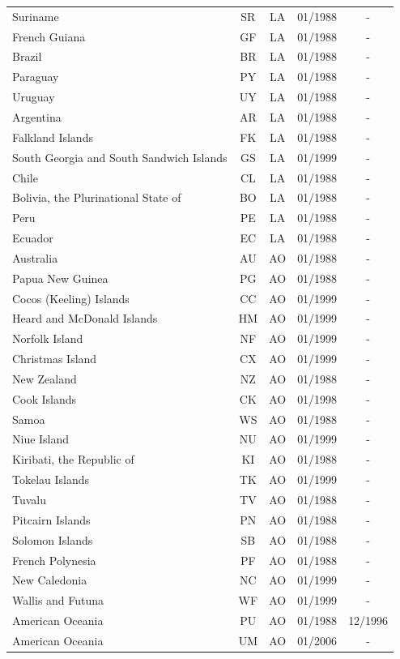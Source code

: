 \begin{small}
\begin{longtable}{p{7.5cm}cccc}
Suriname	&	SR	&	LA	&	01/1988	&	-	\\
French Guiana	&	GF	&	LA	&	01/1988	&	-	\\
Brazil	&	BR	&	LA	&	01/1988	&	-	\\
Paraguay	&	PY	&	LA	&	01/1988	&	-	\\
Uruguay	&	UY	&	LA	&	01/1988	&	-	\\
Argentina	&	AR	&	LA	&	01/1988	&	-	\\
Falkland Islands	&	FK	&	LA	&	01/1988	&	-	\\
South Georgia and South Sandwich Islands	&	GS	&	LA	&	01/1999	&	-	\\
Chile	&	CL	&	LA	&	01/1988	&	-	\\
Bolivia, the Plurinational State of	&	BO	&	LA	&	01/1988	&	-	\\
Peru	&	PE	&	LA	&	01/1988	&	-	\\
Ecuador	&	EC	&	LA	&	01/1988	&	-	\\
Australia	&	AU	&	AO	&	01/1988	&	-	\\
Papua New Guinea	&	PG	&	AO	&	01/1988	&	-	\\
Cocos (Keeling) Islands	&	CC	&	AO	&	01/1999	&	-	\\
Heard and McDonald Islands	&	HM	&	AO	&	01/1999	&	-	\\
Norfolk Island	&	NF	&	AO	&	01/1999	&	-	\\
Christmas Island	&	CX	&	AO	&	01/1999	&	-	\\
New Zealand	&	NZ	&	AO	&	01/1988	&	-	\\
Cook Islands	&	CK	&	AO	&	01/1998	&	-	\\
Samoa	&	WS	&	AO	&	01/1988	&	-	\\
Niue Island	&	NU	&	AO	&	01/1999	&	-	\\
Kiribati, the Republic of	&	KI	&	AO	&	01/1988	&	-	\\
Tokelau Islands	&	TK	&	AO	&	01/1999	&	-	\\
Tuvalu	&	TV	&	AO	&	01/1988	&	-	\\
Pitcairn Islands	&	PN	&	AO	&	01/1988	&	-	\\
Solomon Islands	&	SB	&	AO	&	01/1988	&	-	\\
French Polynesia	&	PF	&	AO	&	01/1988	&	-	\\
New Caledonia	&	NC	&	AO	&	01/1999	&	-	\\
Wallis and Futuna	&	WF	&	AO	&	01/1999	&	-	\\
American Oceania	&	PU	&	AO	&	01/1988	&	12/1996	\\
American Oceania	&	UM	&	AO	&	01/2006	&	-	\\

\end{longtable}
\end{small}
